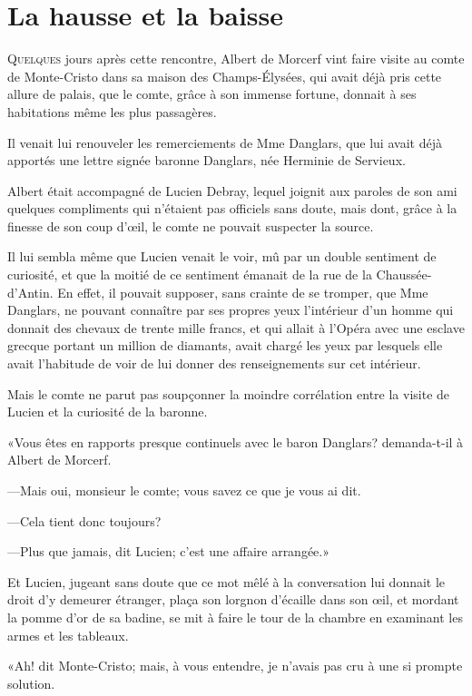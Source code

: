 \chapter{La hausse et la baisse}

\lettrine{Q}{uelques} jours après cette rencontre, Albert de Morcerf vint faire visite au comte de Monte-Cristo dans sa maison des Champs-Élysées, qui avait déjà pris cette allure de palais, que le comte, grâce à son immense fortune, donnait à ses habitations même les plus passagères. 

Il venait lui renouveler les remerciements de Mme Danglars, que lui avait déjà apportés une lettre signée baronne Danglars, née Herminie de Servieux. 

Albert était accompagné de Lucien Debray, lequel joignit aux paroles de son ami quelques compliments qui n'étaient pas officiels sans doute, mais dont, grâce à la finesse de son coup d'œil, le comte ne pouvait suspecter la source. 

Il lui sembla même que Lucien venait le voir, mû par un double sentiment de curiosité, et que la moitié de ce sentiment émanait de la rue de la Chaussée-d'Antin. En effet, il pouvait supposer, sans crainte de se tromper, que Mme Danglars, ne pouvant connaître par ses propres yeux l'intérieur d'un homme qui donnait des chevaux de trente mille francs, et qui allait à l'Opéra avec une esclave grecque portant un million de diamants, avait chargé les yeux par lesquels elle avait l'habitude de voir de lui donner des renseignements sur cet intérieur. 

Mais le comte ne parut pas soupçonner la moindre corrélation entre la visite de Lucien et la curiosité de la baronne. 

«Vous êtes en rapports presque continuels avec le baron Danglars? demanda-t-il à Albert de Morcerf. 

—Mais oui, monsieur le comte; vous savez ce que je vous ai dit. 

—Cela tient donc toujours? 

—Plus que jamais, dit Lucien; c'est une affaire arrangée.» 

Et Lucien, jugeant sans doute que ce mot mêlé à la conversation lui donnait le droit d'y demeurer étranger, plaça son lorgnon d'écaille dans son œil, et mordant la pomme d'or de sa badine, se mit à faire le tour de la chambre en examinant les armes et les tableaux. 

«Ah! dit Monte-Cristo; mais, à vous entendre, je n'avais pas cru à une si prompte solution. 


